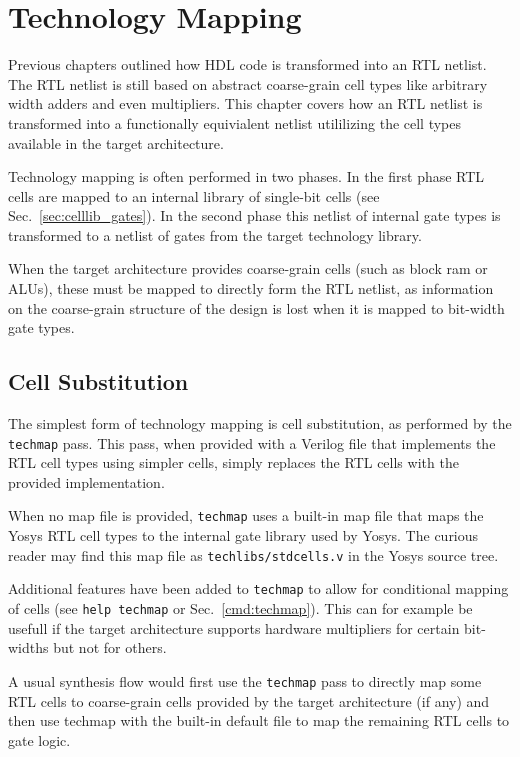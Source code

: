 
\chapter{Technology Mapping}
\label{chapter:techmap}

Previous chapters outlined how HDL code is transformed into an RTL netlist. The
RTL netlist is still based on abstract coarse-grain cell types like arbitrary
width adders and even multipliers. This chapter covers how an RTL netlist is
transformed into a functionally equivialent netlist utililizing the cell types
available in the target architecture.

Technology mapping is often performed in two phases. In the first phase RTL cells
are mapped to an internal library of single-bit cells (see Sec.~\ref{sec:celllib_gates}).
In the second phase this netlist of internal gate types is transformed to a netlist
of gates from the target technology library.

When the target architecture provides coarse-grain cells (such as block ram
or ALUs), these must be mapped to directly form the RTL netlist, as information
on the coarse-grain structure of the design is lost when it is mapped to
bit-width gate types.

\section{Cell Substitution}

The simplest form of technology mapping is cell substitution, as performed by
the {\tt techmap} pass. This pass, when provided with a Verilog file that
implements the RTL cell types using simpler cells, simply replaces the RTL
cells with the provided implementation.

When no map file is provided, {\tt techmap} uses a built-in map file that
maps the Yosys RTL cell types to the internal gate library used by Yosys.
The curious reader may find this map file as {\tt techlibs/stdcells.v} in
the Yosys source tree.

Additional features have been added to {\tt techmap} to allow for conditional
mapping of cells (see {\tt help techmap} or Sec.~\ref{cmd:techmap}). This can
for example be usefull if the target architecture supports hardware multipliers for
certain bit-widths but not for others.

A usual synthesis flow would first use the {\tt techmap} pass to directly map
some RTL cells to coarse-grain cells provided by the target architecture (if
any) and then use techmap with the built-in default file to map the remaining
RTL cells to gate logic.

